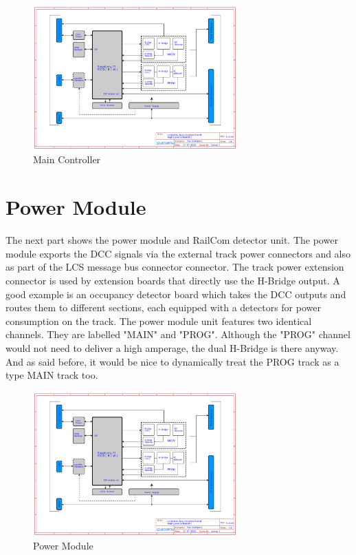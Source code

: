 \begin{figure}[htbp]
    \centering
    \includegraphics[page=2, width=0.7\textwidth]{./Schematics/Schematic_LcsNodes-Base-Station-Board.pdf}
    \caption{Main Controller}
\end{figure}
\FloatBarrier

\section{Power Module}

The next part shows the power module and RailCom detector unit. The power module exports the DCC signals via the external track power connectors and also as part of the LCS message bus connector connector. The track power extension connector is used by extension boards that directly use the H-Bridge output. A good example is an occupancy detector board which takes the DCC outputs and routes them to different sections, each equipped with a detectors for power consumption on the track. The power module unit features two identical channels. They are labelled "MAIN" and "PROG". Although the "PROG" channel would not need to deliver a high amperage, the dual H-Bridge is there anyway. And as said before, it would be nice to dynamically treat the PROG track as a type MAIN track too. 

\begin{figure}[htbp]
    \centering
    \includegraphics[page=3, width=0.7\textwidth]{./Schematics/Schematic_LcsNodes-Base-Station-Board.pdf}
    \caption{Power Module}
\end{figure}
\FloatBarrier

